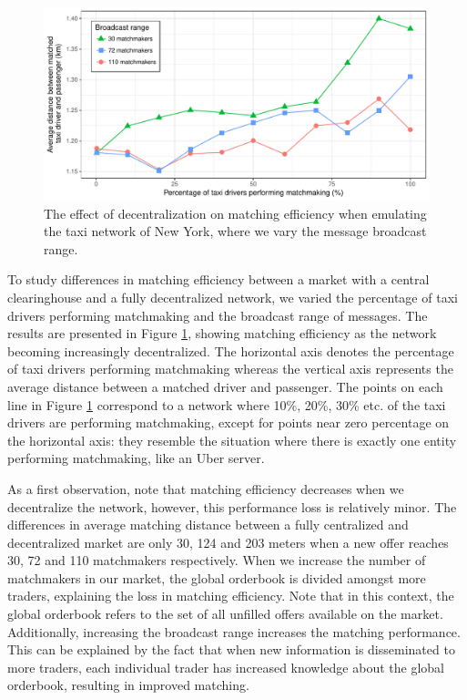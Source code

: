 \documentclass[USenglish]{article}
\begin{document}
\begin{figure}[t]
	\centering
	\includegraphics[width=1\columnwidth]{assets/matching_efficiency.pdf}
	\caption{The effect of decentralization on matching efficiency when emulating the taxi network of New York, where we vary the message broadcast range.}
	\label{fig:matching_efficiency}
\end{figure}

To study differences in matching efficiency between a market with a central clearinghouse and a fully decentralized network, we varied the percentage of taxi drivers performing matchmaking and the broadcast range of messages.
The results are presented in Figure \ref{fig:matching_efficiency}, showing matching efficiency as the network becoming increasingly decentralized.
The horizontal axis denotes the percentage of taxi drivers performing matchmaking whereas the vertical axis represents the average distance between a matched driver and passenger.
The points on each line in Figure \ref{fig:matching_efficiency} correspond to a network where 10\%, 20\%, 30\% etc. of the taxi drivers are performing matchmaking, except for points near zero percentage on the horizontal axis: they resemble the situation where there is exactly one entity performing matchmaking, like an Uber server.

As a first observation, note that matching efficiency decreases when we decentralize the network, however, this performance loss is relatively minor.
The differences in average matching distance between a fully centralized and decentralized market are only 30, 124 and 203 meters when a new offer reaches 30, 72 and 110 matchmakers respectively.
When we increase the number of matchmakers in our market, the global orderbook is divided amongst more traders, explaining the loss in matching efficiency.
Note that in this context, the global orderbook refers to the set of all unfilled offers available on the market.
Additionally, increasing the broadcast range increases the matching performance.
This can be explained by the fact that when new information is disseminated to more traders, each individual trader has increased knowledge about the global orderbook, resulting in improved matching.
\end{document}

